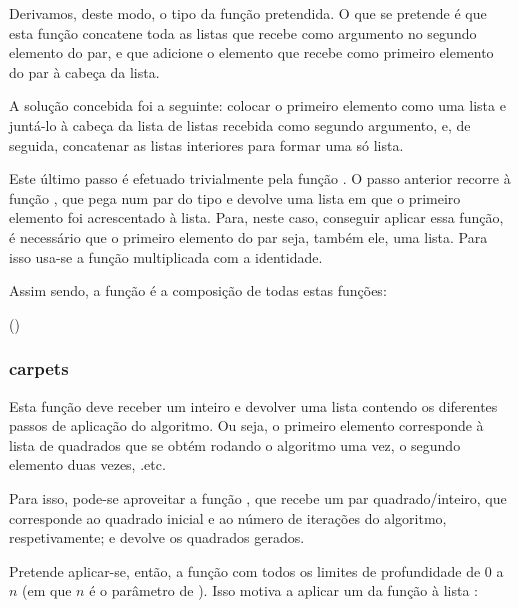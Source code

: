 \documentclass[a4paper]{article}
\newcommand{\Varid}[1]{\mathit{#1}}
\def\resethooks{%
  \global\let\SaveRestoreHook\empty
  \global\let\ColumnHook\empty}
\let\hspre\empty
\let\hspost\empty
\begin{document}
Derivamos, deste modo, o tipo da função  pretendida. O que se pretende é que esta função concatene toda as listas que recebe como argumento no segundo elemento do par, e que adicione o elemento que recebe como primeiro elemento do par à cabeça da lista. 

A solução concebida foi a seguinte: colocar o primeiro elemento como uma lista e juntá-lo à cabeça da lista de listas recebida como segundo argumento, e, de seguida, concatenar as listas interiores para formar uma só lista. 

Este último passo é efetuado trivialmente pela função . O passo anterior recorre à função , que pega num par do tipo  e devolve uma lista em que o primeiro elemento foi acrescentado à lista. Para, neste caso, conseguir aplicar essa função, é necessário que o primeiro elemento do par seja, também ele, uma lista. Para isso usa-se a função  multiplicada com a identidade. 

Assim sendo, a função  é a composição de todas estas funções:

\begin{hscode}\SaveRestoreHook
\column{B}{@{}>{\hspre}l<{\hspost}@{}}%
\column{E}{@{}>{\hspre}l<{\hspost}@{}}%
\>[B]{}\Varid{gr2l}\mathrel{=}\Varid{concat}\comp \Varid{cons}\comp (\Varid{singl}\times\Varid{id}){}\<[E]%
\ColumnHook
\end{hscode}\resethooks

\subsubsection*{carpets}

Esta função deve receber um inteiro e devolver uma lista contendo os diferentes passos de aplicação do algoritmo. Ou seja, o primeiro elemento corresponde à lista de quadrados que se obtém rodando o algoritmo uma vez, o segundo elemento duas vezes, .etc.

Para isso, pode-se aproveitar a função , que recebe um par quadrado/inteiro, que corresponde ao quadrado inicial e ao número de iterações do algoritmo, respetivamente; e devolve os quadrados gerados.

Pretende aplicar-se, então, a função  com todos os limites de profundidade de 0 a $n$ (em que $n$ é o parâmetro de ). Isso motiva a aplicar um  da função  à lista :
\end{document}
